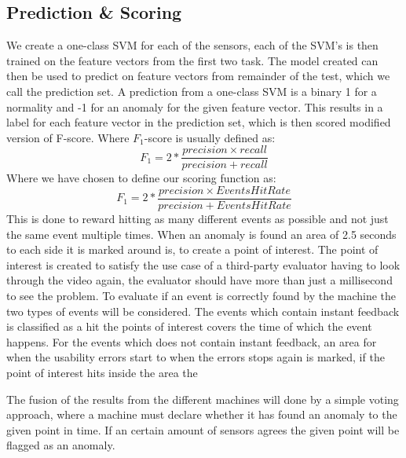 \subsection{Prediction \& Scoring}
We create a one-class SVM for each of the sensors, each of the SVM's is then trained on the feature vectors from the first two task. The model created can then be used to predict on feature vectors from remainder of the test, which we call the prediction set.
A prediction from a one-class SVM is a binary 1 for a normality and -1 for an anomaly for the given feature vector.
This results in a label for each feature vector in the prediction set, which is then scored modified version of F-score.
Where $F_{1}$-score is usually defined as: \[F_1 = 2 * \frac{precision \times recall}{precision + recall}\] Where we have chosen to define our scoring function as: \[F_1 = 2 * \frac{precision \times EventsHitRate}{precision + EventsHitRate}\] This is done to reward hitting as many different events as possible and not just the same event multiple times.
When an anomaly is found an area of 2.5 seconds to each side it is marked around is, to create a point of interest. The point of interest is created to satisfy the use case of a third-party evaluator having to look through the video again, the evaluator should have more than just a millisecond to see the problem. 
To evaluate if an event is correctly found by the machine the two types of events will be considered.
The events which contain instant feedback is classified as a hit the points of interest covers the time of which the event happens.
For the events which does not contain instant feedback, an area for when the usability errors start to when the errors stops again is marked, if the point of interest hits inside the area the 

The fusion of the results from the different machines will done by a simple voting approach, where a machine must declare whether it has found an anomaly to the given point in time. If an certain amount of sensors agrees the given point will be flagged as an anomaly. 




